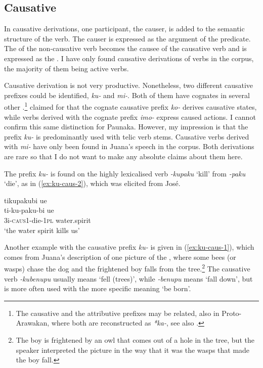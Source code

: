 \subsection{Causative}\label{sec:Causative}

In causative derivations, one participant, the causer, is added to the semantic structure of the verb. The causer is expressed as the  argument of the predicate. The  of the non-causative verb becomes the causee of the causative verb and is expressed as the . I have only found causative derivations of  verbs in the corpus, the majority of them being active verbs. 

Causative derivation is not very productive. Nonetheless, two different causative prefixes could be identified, \textit{ku-} and \textit{mi-}. Both of them have cognates in several other  \citep[cf.][293]{Aikhenvald2002}.\footnote{The causative and the attributive prefixes may be related, also in Proto-Arawakan, where both are reconstructed as \textit{*ka-}, see also .} %
\citet[295]{Danielsen2014a} claimed for  that the cognate causative prefix \textit{ko-} derives causative states, while verbs derived with the cognate prefix \textit{imo-} express caused actions. I cannot confirm this same distinction for Paunaka. However, my impression is that the prefix \textit{ku-} is predominantly used with telic verb stems. Causative verbs derived with \textit{mi-} have only been found in Juana’s speech in the corpus. Both derivations are rare so that I do not want to make any absolute claims about them here.

The prefix \textit{ku-} is found on the highly lexicalised verb \textit{-kupaku} ‘kill’ from \textit{-paku} ‘die’, as in (\ref{ex:ku-caus-2}), which was elicited from José.

\ea\label{ex:ku-caus-2}
\begingl
\glpreamble tikupakubi ue\\
\gla ti-ku-paku-bi ue\\
\glb 3i-\textsc{caus}1-die-1\textsc{pl} water.spirit\\
\glft ‘the water spirit kills us’
\endgl
\trailingcitation{[oxx-m110814sf-2]}%
\xe

Another example with the causative prefix \textit{ku-} is given in (\ref{ex:ku-caus-1}), which comes from Juana’s description of one picture of the  \citep[]{Mayer2003}, where some bees (or wasps) chase the dog and the frightened boy falls from the tree.\footnote{The boy is frightened by an owl that comes out of a hole in the tree, but the speaker interpreted the picture in the way that it was the wasps that made the boy fall.} The causative verb \textit{-kubenupu} usually means ‘fell (trees)’, while \textit{-benupu} means ‘fall down’, but is more often used with the more specific meaning ‘be born’.

